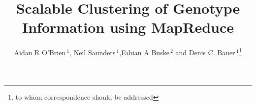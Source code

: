 \documentclass{bioinfo}
\begin{document}

	
\newcommand{\OnePhaseone}{phase1\_chr1}
\newcommand{\NinteenPhaseone}{phase1\_chr19}
\newcommand{\SevenPhaseone}{phase1\_chr1-7}
\newcommand{\FullPhaseone}{phase1\_chr1-22}
\newcommand{\OnePhasethree}{phase3\_chr1}
\newcommand{\ThreePhasethree}{phase3\_chr1-3}
\newcommand{\FullPhasethree}{phase3\_chr1-22}
\newcommand{\ARI}{Adjusted Rand Index}

\title[MapReduce Clustering]{Scalable Clustering of Genotype Information using MapReduce}
\author[O'Brien \textit{et~al}]{Aidan R O'Brien\,$^{1}$, Neil Saunders\,$^1$,Fabian A Buske\,$^{2}$ and Denis C. Bauer\,$^1$\footnote{to whom correspondence should be addressed}}
\address{$^{1}$CSIRO, Digital Productivity Flagship, 11 Julius Av, 2113, Sydney, Australia\\
$^{2}$Cancer Epigenetics Program, Cancer Research Division, Kinghorn Cancer Centre, Garvan Institute of Medical Research, 384 Victoria St, 2010, Sydney, Australia}



\maketitle
\end{document}
